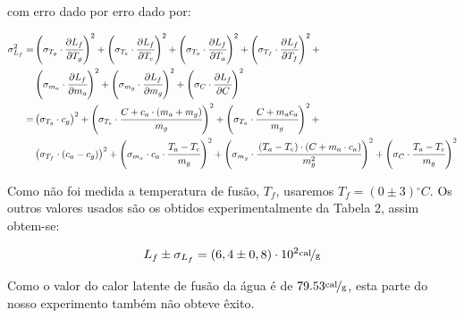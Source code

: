 \documentclass[a4paper]{article}
\begin{document}
				com erro dado por erro dado por:
				
	            \begin{align*}
	    			\sigma_{L_{f}}^{2} = &
	    				\left(\sigma_{T_{g}}\cdot\cfrac{\partial L_{f}}{\partial T_{g}}\right)^{2}+
	    				\left(\sigma_{T_{e}}\cdot\cfrac{\partial L_{f}}{\partial T_{e}}\right)^{2}+
	    				\left(\sigma_{T_{a}}\cdot\cfrac{\partial L_{f}}{\partial T_{a}}\right)^{2}+
	    				\left(\sigma_{T_{f}}\cdot\cfrac{\partial L_{f}}{\partial T_{f}}\right)^{2}+ \\ &
	    				\left(\sigma_{m_{a}}\cdot\cfrac{\partial L_{f}}{\partial m_{a}}\right)^{2}+
	    				\left(\sigma_{m_{g}}\cdot\cfrac{\partial L_{f}}{\partial m_{g}}\right)^{2}+
	    				\left(\sigma_{C}\cdot\cfrac{\partial L_{f}}{\partial C}\right)^{2} 
	    			\\
	    			= &
	    				\left(\sigma_{T_{g}}\cdot c_{g}\right)^{2}+
	    				\left(\sigma_{T_{e}}\cdot\cfrac{C+c_{a}\cdot\left(m_{a}+m_{g}\right)}{m_{g}}\right)^{2}+
	    				\left(\sigma_{T_{a}}\cdot\cfrac{C+m_{a}c_{a}}{m_{g}}\right)^{2}+
	    				\\ &
	    				\left(\sigma_{T_{f}}\cdot\left(c_{a}-c_{g}\right)\right)^{2}+
	    				\left(\sigma_{m_{a}}\cdot c_{a}\cdot\cfrac{T_{a}-T_{e}}{m_{g}}\right)^{2}+
	    				\left(\sigma_{m_{g}}\cdot\cfrac{\left(T_{a}-T_{e}\right)\cdot\left(C+m_{a}\cdot c_{a}\right)}{m_{g}^{2}}\right)^{2}+
	    				\left(\sigma_{C}\cdot\cfrac{T_{a}-T_{e}}{m_{g}}\right)^{2}
	    				\\
	    		\end{align*}

				Como não foi medida a temperatura de fusão, $T_{f}$, usaremos $T_{f}=\left(0\pm3\right)\unit{^{\circ}C}$.
				Os outros valores usados são os obtidos experimentalmente da Tabela
				2, assim obtem-se:

				\[
					L_{f}\pm\sigma_{L_{f}}=\left(6,4\pm0,8\right)\cdot10^{2}\unitfrac{cal}{g}
				\]


				Como o valor do calor latente de fusão da água é de $79.53\unitfrac{cal}{g}$,
				esta parte do nosso experimento também não obteve êxito.
\end{document}
